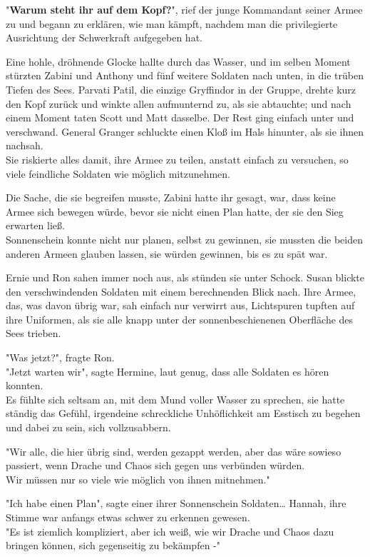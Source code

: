 {"\textbf{Warum steht ihr auf dem Kopf?}", rief der junge Kommandant seiner Armee zu und begann zu erklären, wie man kämpft, nachdem man die privilegierte Ausrichtung der Schwerkraft aufgegeben hat.

Eine hohle, dröhnende Glocke hallte durch das Wasser, und im selben Moment stürzten Zabini und Anthony und fünf weitere Soldaten nach unten, in die trüben Tiefen des Sees. Parvati Patil, die einzige Gryffindor in der Gruppe, drehte kurz den Kopf zurück und winkte allen aufmunternd zu, als sie abtauchte; und nach einem Moment taten Scott und Matt dasselbe. Der Rest ging einfach unter und verschwand. General Granger schluckte einen Kloß im Hals hinunter, als sie ihnen nachsah.\\ Sie riskierte alles damit, ihre Armee zu teilen, anstatt einfach zu versuchen, so viele feindliche Soldaten wie möglich mitzunehmen.

Die Sache, die sie begreifen musste, Zabini hatte ihr gesagt, war, dass keine Armee sich bewegen würde, bevor sie nicht einen Plan hatte, der sie den Sieg erwarten ließ.\\ Sonnenschein konnte nicht nur planen, selbst zu gewinnen, sie mussten die beiden anderen Armeen glauben lassen, sie würden gewinnen, bis es zu spät war.

Ernie und Ron sahen immer noch aus, als stünden sie unter Schock. Susan blickte den verschwindenden Soldaten mit einem berechnenden Blick nach. Ihre Armee, das, was davon übrig war, sah einfach nur verwirrt aus, Lichtspuren tupften auf ihre Uniformen, als sie alle knapp unter der sonnenbeschienenen Oberfläche des Sees trieben.

"Was jetzt?", fragte Ron.\\ "Jetzt warten wir", sagte Hermine, laut genug, dass alle Soldaten es hören konnten.\\ Es fühlte sich seltsam an, mit dem Mund voller Wasser zu sprechen, sie hatte ständig das Gefühl, irgendeine schreckliche Unhöflichkeit am Esstisch zu begehen und dabei zu sein, sich vollzusabbern.

"Wir alle, die hier übrig sind, werden gezappt werden, aber das wäre sowieso passiert, wenn Drache und Chaos sich gegen uns verbünden würden.\\ Wir müssen nur so viele wie möglich von ihnen mitnehmen."

"Ich habe einen Plan", sagte einer ihrer Sonnenschein Soldaten… Hannah, ihre Stimme war anfangs etwas schwer zu erkennen gewesen.\\ "Es ist ziemlich kompliziert, aber ich weiß, wie wir Drache und Chaos dazu bringen können, sich gegenseitig zu bekämpfen -"

}
